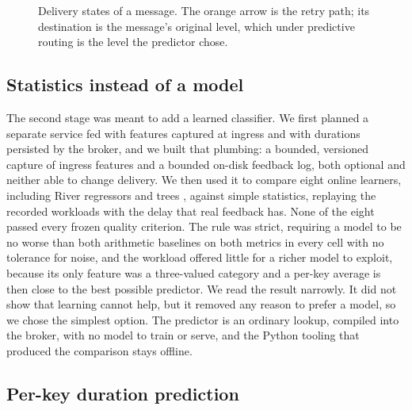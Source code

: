 \begin{figure}[t]
  \centering
  
  \caption{Delivery states of a message. The orange arrow is the retry path; its destination is the message's original level, which under
  predictive routing is the level the predictor chose.}
  \label{fig:states}
\end{figure}

\subsection{Statistics instead of a model}\label{sec:statistics}

The second stage was meant to add a learned classifier. We first planned a separate service fed with features captured at ingress and with durations persisted by the
broker, and we built that plumbing: a bounded, versioned capture of ingress features and a bounded on-disk feedback log, both optional and neither able to change
delivery. We then used it to compare eight online learners, including River regressors and trees \citep{montiel2021}, against simple statistics, replaying the recorded workloads with the
delay that real feedback has. None of the eight passed every frozen quality criterion. The rule was strict, requiring a model to be no worse than both arithmetic
baselines on both metrics in every cell with no tolerance for noise, and the workload offered little for a richer model to exploit, because its only feature was a
three-valued category and a per-key average is then close to the best possible predictor. We read the result narrowly. It did not show that learning cannot help, but it
removed any reason to prefer a model, so we chose the simplest option. The predictor is an ordinary lookup, compiled into the broker, with no model to train or serve,
and the Python tooling that produced the comparison stays offline.

\subsection{Per-key duration prediction}\label{sec:predict}

